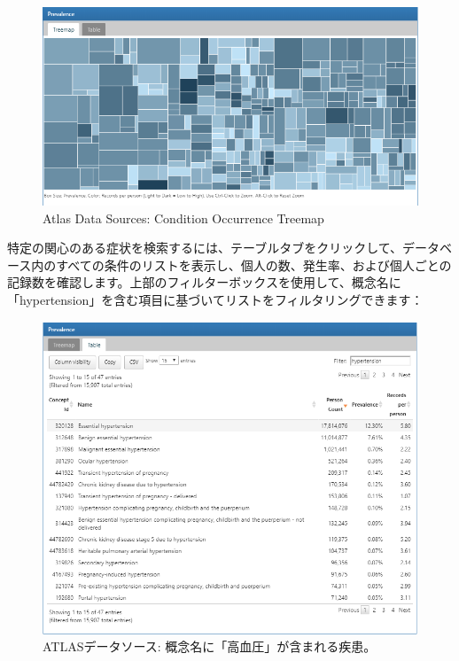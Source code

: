 \documentclass[
  11pt]{book}
\theoremstyle{definition}
\theoremstyle{definition}
\theoremstyle{definition}
\theoremstyle{definition}
\theoremstyle{remark}
\begin{document}
\begin{figure}

{\centering \includegraphics[width=1\linewidth]{images/Characterization/atlasDataSourcesConditionTreemap} 

}

\caption{Atlas Data Sources: Condition Occurrence Treemap}\label{fig:atlasDataSourcesConditionTreemap}
\end{figure}

特定の関心のある症状を検索するには、テーブルタブをクリックして、データベース内のすべての条件のリストを表示し、個人の数、発生率、および個人ごとの記録数を確認します。上部のフィルターボックスを使用して、概念名に「hypertension」を含む項目に基づいてリストをフィルタリングできます：

\begin{figure}

{\centering \includegraphics[width=1\linewidth]{images/Characterization/atlasDataSourcesConditionFiltered} 

}

\caption{ATLASデータソース: 概念名に「高血圧」が含まれる疾患。}\label{fig:atlasDataSourcesConditionFiltered}
\end{figure}
\end{document}
